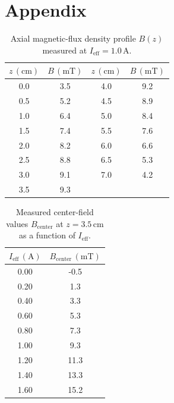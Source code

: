 \documentclass[a4paper]{article}
\begin{document}
\newpage
\section{Appendix}

\begin{table}[H]
  \centering
  \begin{tabular}{|c|c|c|c|}
    \toprule
    $z\,(\mathrm{cm})$ & $B\,(\mathrm{mT})$ & $z\,(\mathrm{cm})$ & $B\,(\mathrm{mT})$ \\
    \midrule
    0.0 & 3.5 & 4.0 & 9.2 \\
    0.5 & 5.2 & 4.5 & 8.9 \\
    1.0 & 6.4 & 5.0 & 8.4 \\
    1.5 & 7.4 & 5.5 & 7.6 \\
    2.0 & 8.2 & 6.0 & 6.6 \\
    2.5 & 8.8 & 6.5 & 5.3 \\
    3.0 & 9.1 & 7.0 & 4.2 \\
    3.5 & 9.3 &  &  \\
    \bottomrule
  \end{tabular}
  \caption{Axial magnetic-flux density profile $B(z)$ measured at $I_{\mathrm{eff}}=1.0\,\mathrm{A}$.}
  \label{tab:Bz_profile_1A}
\end{table}

\begin{table}[H]
  \centering
  \begin{tabular}{|c|c|}
    \toprule
    $I_{\mathrm{eff}}\,(\mathrm{A})$ & $B_{\mathrm{center}}\,(\mathrm{mT})$ \\
    \midrule
    0.00 & -0.5 \\
    0.20 & 1.3 \\
    0.40 & 3.3 \\
    0.60 & 5.3 \\
    0.80 & 7.3 \\
    1.00 & 9.3 \\
    1.20 & 11.3 \\
    1.40 & 13.3 \\
    1.60 & 15.2 \\
    \bottomrule
  \end{tabular}
  \caption{Measured center-field values $B_{\mathrm{center}}$ at $z=3.5\,\mathrm{cm}$ as a function of $I_{\mathrm{eff}}$.}
  \label{tab:Bcenter_Ieff}
\end{table}
\end{document}
